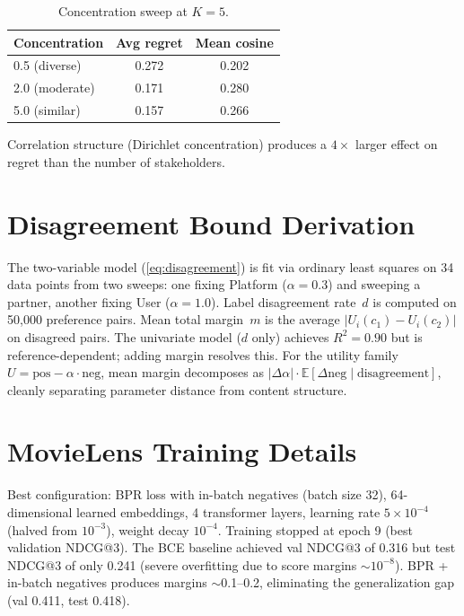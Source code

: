 \documentclass[11pt,letterpaper]{article}
\begin{document}
\begin{table}[H]
\caption{Concentration sweep at $K = 5$.}
\label{tab:concentration}
\centering\small
\begin{tabular}{lcc}
\toprule
Concentration & Avg regret & Mean cosine \\
\midrule
0.5 (diverse) & 0.272 & 0.202 \\
2.0 (moderate) & 0.171 & 0.280 \\
5.0 (similar) & 0.157 & 0.266 \\
\bottomrule
\end{tabular}
\end{table}

Correlation structure (Dirichlet concentration) produces a $4\times$
larger effect on regret than the number of stakeholders.

\section{Disagreement Bound Derivation}
\label{app:disagreement}

The two-variable model (\cref{eq:disagreement}) is fit via ordinary
least squares on 34 data points from two sweeps: one fixing Platform
($\alpha = 0.3$) and sweeping a partner, another fixing User
($\alpha = 1.0$). Label disagreement rate~$d$ is computed on 50{,}000
preference pairs. Mean total margin~$m$ is the average
$|U_i(c_1) - U_i(c_2)|$ on disagreed pairs. The univariate model
($d$ only) achieves $R^2 = 0.90$ but is reference-dependent; adding
margin resolves this. For the utility family
$U = \text{pos} - \alpha \cdot \text{neg}$, mean margin decomposes as
$|\Delta\alpha| \cdot \mathbb{E}[\Delta\text{neg} \mid \text{disagreement}]$,
cleanly separating parameter distance from content structure.

\section{MovieLens Training Details}
\label{app:movielens}

Best configuration: BPR loss with in-batch negatives (batch size 32),
64-dimensional learned embeddings, 4 transformer layers,
learning rate $5 \times 10^{-4}$ (halved from $10^{-3}$), weight
decay $10^{-4}$. Training stopped at epoch 9 (best validation
NDCG@3). The BCE baseline achieved val NDCG@3 of 0.316 but test
NDCG@3 of only 0.241 (severe overfitting due to score margins
$\sim 10^{-8}$). BPR + in-batch negatives produces margins $\sim$0.1--0.2,
eliminating the generalization gap (val 0.411, test 0.418).
\end{document}
